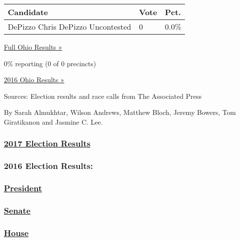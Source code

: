 \begin{longtable}[]{@{}lll@{}}
\toprule
Candidate & Vote & Pct.\tabularnewline
\midrule
\endhead
 DePizzo Chris DePizzo Uncontested & 0 & 0.0\%\tabularnewline
\bottomrule
\end{longtable}

\href{https://www.nytimes3xbfgragh.onion/elections/results/ohio}{Full
Ohio Results »}

0\% reporting (0 of 0 precincts)

\href{https://www.nytimes3xbfgragh.onion/elections/results/ohio}{2016
Ohio Results »}

Sources: Election results and race calls from The Associated Press

By Sarah Almukhtar, Wilson Andrews, Matthew Bloch, Jeremy Bowers, Tom
Giratikanon and Jasmine C. Lee.

\hypertarget{2017-election-results}{%
\subsubsection{\texorpdfstring{\href{https://www.nytimes3xbfgragh.onion/interactive/2017/us/elections/election-calendar.html}{2017
Election Results}}{2017 Election Results}}\label{2017-election-results}}

\hypertarget{2016-election-results}{%
\subsubsection{2016 Election Results:}\label{2016-election-results}}

\hypertarget{president}{%
\subsubsection{\texorpdfstring{\href{https://www.nytimes3xbfgragh.onion/elections/results/president}{President}}{President}}\label{president}}

\hypertarget{senate}{%
\subsubsection{\texorpdfstring{\href{https://www.nytimes3xbfgragh.onion/elections/results/senate}{Senate}}{Senate}}\label{senate}}

\hypertarget{house}{%
\subsubsection{\texorpdfstring{\href{https://www.nytimes3xbfgragh.onion/elections/results/house}{House}}{House}}\label{house}}

